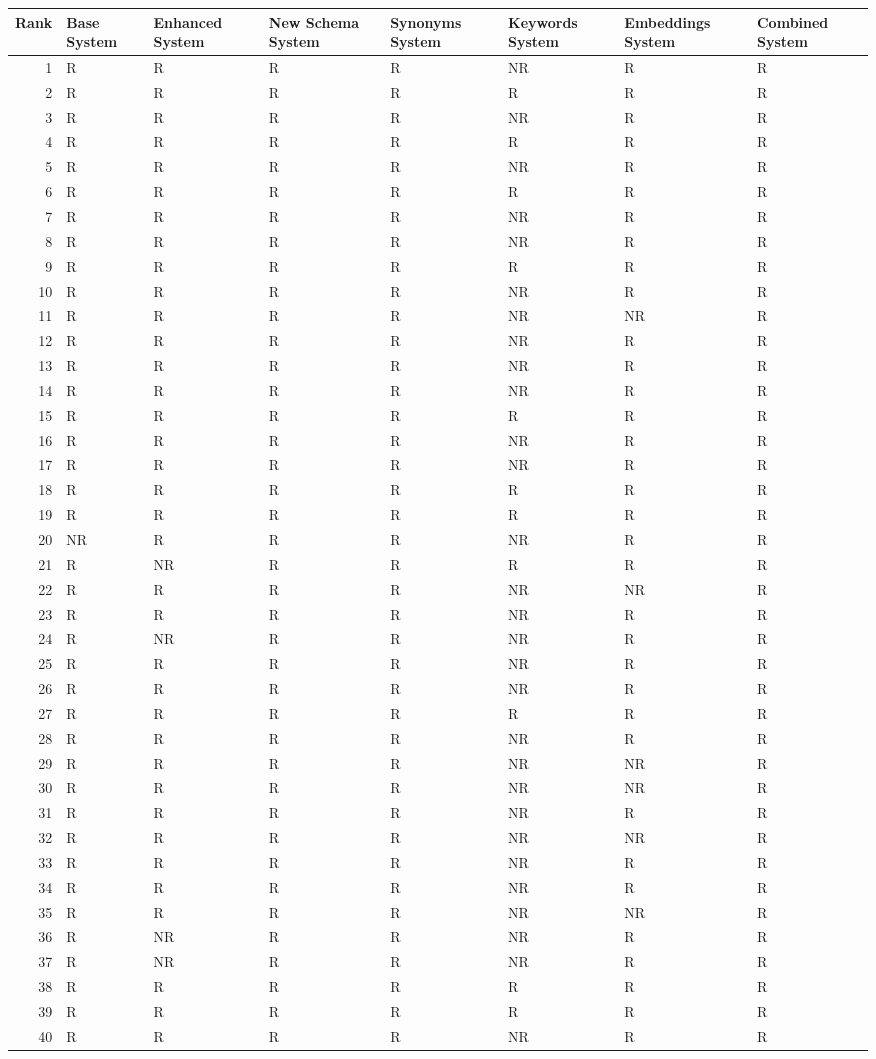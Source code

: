 \begin{tabular}{rlllllll}
\toprule
Rank & Base System & Enhanced System & New Schema System & Synonyms System & Keywords System & Embeddings System & Combined System \\
\midrule
1 & R & R & R & R & NR & R & R \\
2 & R & R & R & R & R & R & R \\
3 & R & R & R & R & NR & R & R \\
4 & R & R & R & R & R & R & R \\
5 & R & R & R & R & NR & R & R \\
6 & R & R & R & R & R & R & R \\
7 & R & R & R & R & NR & R & R \\
8 & R & R & R & R & NR & R & R \\
9 & R & R & R & R & R & R & R \\
10 & R & R & R & R & NR & R & R \\
11 & R & R & R & R & NR & NR & R \\
12 & R & R & R & R & NR & R & R \\
13 & R & R & R & R & NR & R & R \\
14 & R & R & R & R & NR & R & R \\
15 & R & R & R & R & R & R & R \\
16 & R & R & R & R & NR & R & R \\
17 & R & R & R & R & NR & R & R \\
18 & R & R & R & R & R & R & R \\
19 & R & R & R & R & R & R & R \\
20 & NR & R & R & R & NR & R & R \\
21 & R & NR & R & R & R & R & R \\
22 & R & R & R & R & NR & NR & R \\
23 & R & R & R & R & NR & R & R \\
24 & R & NR & R & R & NR & R & R \\
25 & R & R & R & R & NR & R & R \\
26 & R & R & R & R & NR & R & R \\
27 & R & R & R & R & R & R & R \\
28 & R & R & R & R & NR & R & R \\
29 & R & R & R & R & NR & NR & R \\
30 & R & R & R & R & NR & NR & R \\
31 & R & R & R & R & NR & R & R \\
32 & R & R & R & R & NR & NR & R \\
33 & R & R & R & R & NR & R & R \\
34 & R & R & R & R & NR & R & R \\
35 & R & R & R & R & NR & NR & R \\
36 & R & NR & R & R & NR & R & R \\
37 & R & NR & R & R & NR & R & R \\
38 & R & R & R & R & R & R & R \\
39 & R & R & R & R & R & R & R \\
40 & R & R & R & R & NR & R & R \\
\bottomrule
\end{tabular}
